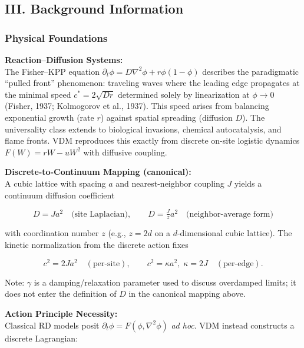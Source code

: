 \documentclass[
]{article}
\begin{document}
\hypertarget{iii.-background-information}{%
\subsection{III. Background
Information}\label{iii.-background-information}}

\hypertarget{physical-foundations}{%
\subsubsection{Physical Foundations}\label{physical-foundations}}

\textbf{Reaction--Diffusion Systems:}\\
The Fisher--KPP equation
\(\partial_{t} \phi = D\nabla^{2}\phi + r\phi(1 - \phi)\) describes the
paradigmatic ``pulled front'' phenomenon: traveling waves where the
leading edge propagates at the minimal speed \(c^{\ast} = 2\sqrt{Dr}\)
determined solely by linearization at \(\phi\to 0\) (Fisher, 1937;
Kolmogorov et al., 1937). This speed arises from balancing exponential
growth (rate \(r\)) against spatial spreading (diffusion \(D\)). The
universality class extends to biological invasions, chemical
autocatalysis, and flame fronts. VDM reproduces this exactly from
discrete on-site logistic dynamics \(F(W) = rW - uW^{2}\) with diffusive
coupling.

\textbf{Discrete-to-Continuum Mapping (canonical):}\\
A cubic lattice with spacing \(a\) and nearest-neighbor coupling \(J\)
yields a continuum diffusion coefficient

\[
D = J a^{2} \quad \text{(site Laplacian)}, \qquad D = \tfrac{J}{z} a^{2} \quad \text{(neighbor-average form)}
\]

with coordination number \(z\) (e.g., \(z=2d\) on a \(d\)-dimensional
cubic lattice). The kinetic normalization from the discrete action fixes

\[
c^{2} = 2 J a^{2} \quad (\text{per-site}), \qquad c^{2} = \kappa a^{2},\; \kappa=2J \quad (\text{per-edge}).
\]

Note: \(\gamma\) is a damping/relaxation parameter used to discuss
overdamped limits; it does not enter the definition of \(D\) in the
canonical mapping above.

\textbf{Action Principle Necessity:}\\
Classical RD models posit
\(\partial_{t} \phi = F(\phi, \nabla^{2}\phi)\) \emph{ad hoc}. VDM
instead constructs a discrete Lagrangian:
\end{document}
